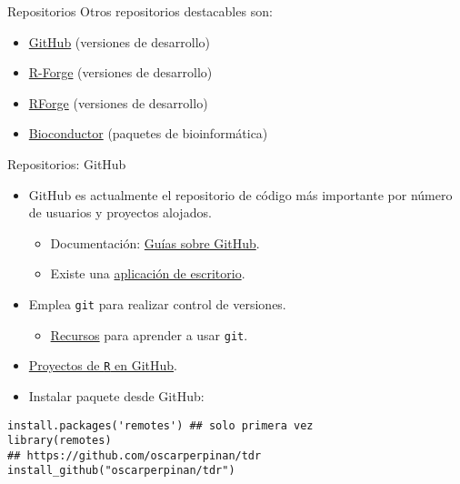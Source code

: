 \documentclass[xcolor={usenames,svgnames,dvipsnames}]{beamer}
\begin{document}
\begin{frame}[label={sec:org24094ac}]{Repositorios}
Otros repositorios destacables son:

\begin{itemize}
\item \href{https://github.com/}{GitHub} (versiones de desarrollo)

\item \href{http://r-forge.r-project.org/}{R-Forge} (versiones de desarrollo)

\item \href{http://rforge.net/}{RForge} (versiones de desarrollo)

\item \href{http://www.bioconductor.org/}{Bioconductor} (paquetes de bioinformática)
\end{itemize}
\end{frame}

\begin{frame}[label={sec:orgcace595},fragile]{Repositorios: GitHub}
 \begin{itemize}
\item GitHub es actualmente el repositorio de código más importante por número de usuarios y proyectos alojados.
\begin{itemize}
\item Documentación: \href{https://guides.github.com/}{Guías sobre GitHub}.
\item Existe una \href{https://desktop.github.com/}{aplicación de escritorio}.
\end{itemize}
\item Emplea \texttt{git} para realizar control de versiones.
\begin{itemize}
\item \href{https://help.github.com/articles/good-resources-for-learning-git-and-github/}{Recursos} para aprender a usar \texttt{git}.
\end{itemize}
\item \href{https://github.com/search?o=desc\&q=language:R\&ref=searchresults\&s=stars\&type=Repositories}{Proyectos de \texttt{R} en GitHub}.
\item Instalar paquete desde GitHub:
\end{itemize}
\lstset{language=r,label= ,caption= ,captionpos=b,numbers=none}
\begin{lstlisting}
install.packages('remotes') ## solo primera vez
library(remotes)
## https://github.com/oscarperpinan/tdr
install_github("oscarperpinan/tdr") 
\end{lstlisting}
\end{frame}
\end{document}
